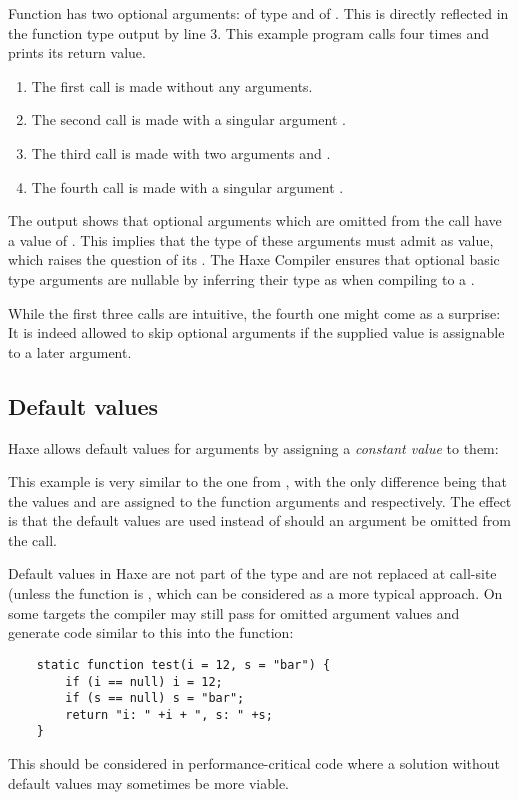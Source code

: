 Function  has two optional arguments:  of type  and  of . This is directly reflected in the function type output by line 3. 
This example program calls  four times and prints its return value.

\begin{enumerate}
	\item The first call is made without any arguments.
	\item The second call is made with a singular argument .
	\item The third call is made with two arguments  and .
	\item The fourth call is made with a singular argument .
\end{enumerate}
The output shows that optional arguments which are omitted from the call have a value of . This implies that the type of these arguments must admit  as value, which raises the question of its . The Haxe Compiler ensures that optional basic type arguments are nullable by inferring their type as  when compiling to a .

While the first three calls are intuitive, the fourth one might come as a surprise: It is indeed allowed to skip optional arguments if the supplied value is assignable to a later argument.


\subsection{Default values}
\label{types-function-default-values}

Haxe allows default values for arguments by assigning a \emph{constant value} to them:

This example is very similar to the one from , with the only difference being that the values  and  are assigned to the function arguments  and  respectively. The effect is that the default values are used instead of  should an argument be omitted from the call.


Default values in Haxe are not part of the type and are not replaced at call-site (unless the function is , which can be considered as a more typical approach. On some targets the compiler may still pass  for omitted argument values and generate code similar to this into the function:
\begin{lstlisting}
	static function test(i = 12, s = "bar") {
		if (i == null) i = 12;
		if (s == null) s = "bar";
		return "i: " +i + ", s: " +s;
	}
\end{lstlisting}
This should be considered in performance-critical code where a solution without default values may sometimes be more viable.




